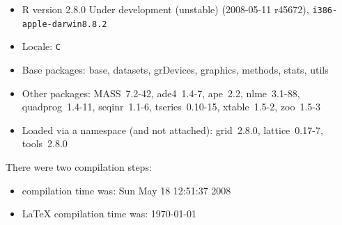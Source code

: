 \documentclass{article}
\begin{document}
\begin{itemize}
  \item R version 2.8.0 Under development (unstable) (2008-05-11 r45672), \verb|i386-apple-darwin8.8.2|
  \item Locale: \verb|C|
  \item Base packages: base, datasets, grDevices, graphics, methods,
    stats, utils
  \item Other packages: MASS~7.2-42, ade4~1.4-7, ape~2.2,
    nlme~3.1-88, quadprog~1.4-11, seqinr~1.1-6, tseries~0.10-15,
    xtable~1.5-2, zoo~1.5-3
  \item Loaded via a namespace (and not attached): grid~2.8.0,
    lattice~0.17-7, tools~2.8.0
\end{itemize}
There were two compilation steps:

\begin{itemize}
  \item \Rlogo{} compilation time was: Sun May 18 12:51:37 2008
  \item \LaTeX{} compilation time was: \today
\end{itemize}



\clearpage
{}


\end{document}

